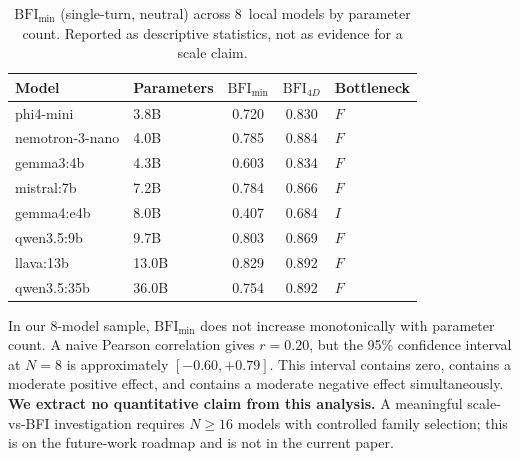 \documentclass[11pt,a4paper]{article}
\begin{document}
\begin{table}[h]
\centering
\caption{$\text{BFI}_{\min}$ (single-turn, neutral) across 8~local models by parameter count. Reported as descriptive statistics, not as evidence for a scale claim.}
\label{tab:scale}
\begin{tabular}{llccl}
\toprule
Model & Parameters & $\text{BFI}_{\min}$ & $\text{BFI}_{4D}$ & Bottleneck \\
\midrule
phi4-mini         & 3.8B  & 0.720 & 0.830 & $F$ \\
nemotron-3-nano   & 4.0B  & 0.785 & 0.884 & $F$ \\
gemma3:4b         & 4.3B  & 0.603 & 0.834 & $F$ \\
mistral:7b        & 7.2B  & 0.784 & 0.866 & $F$ \\
gemma4:e4b        & 8.0B  & 0.407 & 0.684 & $I$ \\
qwen3.5:9b        & 9.7B  & 0.803 & 0.869 & $F$ \\
llava:13b         & 13.0B & 0.829 & 0.892 & $F$ \\
qwen3.5:35b       & 36.0B & 0.754 & 0.892 & $F$ \\
\bottomrule
\end{tabular}
\end{table}

In our 8-model sample, $\text{BFI}_{\min}$ does not increase monotonically with parameter count. A naive Pearson correlation gives $r = 0.20$, but the 95\% confidence interval at $N = 8$ is approximately $[-0.60, +0.79]$. This interval contains zero, contains a moderate positive effect, and contains a moderate negative effect simultaneously. \textbf{We extract no quantitative claim from this analysis.} A meaningful scale-vs-BFI investigation requires $N \geq 16$ models with controlled family selection; this is on the future-work roadmap and is not in the current paper.
\end{document}
